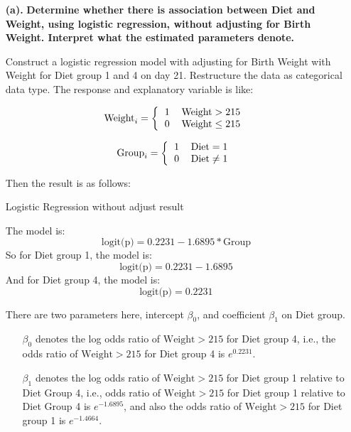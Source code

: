 \documentclass[10pt,letterpaper]{article}
\begin{document}
\begin{enumerate}[leftmargin=0cm,itemindent=.5cm,labelwidth=\itemindent,labelsep=0cm,align=left]
\item[\textbf{(a).} ] \textbf{Determine whether there is association between Diet and Weight, using logistic regression, without adjusting for Birth Weight. Interpret what the estimated parameters denote.}

Construct a logistic regression model with adjusting for Birth Weight with Weight for Diet group 1 and 4 on day 21. Restructure the data as categorical data type. The response and explanatory variable is like:\\
\begin{multicols}{2}
\[\text{Weight}_i=  
\left \{
  \begin{tabular}{cc}
  1 &  $\text{Weight}>215$\\
  0 &  $\text{Weight} \leq 215$\\
  \end{tabular}
\right.
\]

\[\text{Group}_i=  
\left \{
  \begin{tabular}{cc}
  1 &  $\text{Diet}=1$\\
  0 &  $\text{Diet} \neq 1$ \\
  \end{tabular}
\right.
\]
\end{multicols}
Then the result is as follows:
\begin{center}
Logistic Regression without adjust result

\end{center}
The model is:
\[\text{logit(p)} =0.2231-1.6895*\text{Group} \]
So for Diet group 1, the model is:
\[\text{logit(p)} = 0.2231-1.6895\]
And for Diet group 4, the model is:
\[\text{logit(p)} = 0.2231\]

There are two parameters here, intercept $\beta_0$, and coefficient $\beta_1$ on Diet group.
\begin{enumerate}[leftmargin=0cm,itemindent=.5cm,labelwidth=\itemindent,labelsep=0cm,align=left]
\item[\textbullet] $\beta_0$ denotes the log odds ratio of $\text{Weight}>215$ for Diet group 4, i.e., the odds ratio of $\text{Weight}>215$  for Diet group 4 is $e^0.2231$.
\item[\textbullet] $\beta_1$ denotes the log odds ratio of $\text{Weight}>215$ for Diet group 1 relative to Diet Group 4, i.e., odds ratio of $\text{Weight}>215$  for Diet group 1 relative to Diet Group 4 is $e^{-1.6895}$,
and also the odds ratio of $\text{Weight}>215$ for Diet group 1 is $e^{-1.4664}$.\\


\end{enumerate}
\end{enumerate}
\end{document}
